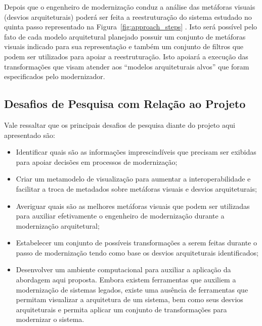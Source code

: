 \documentclass[12pt]{article}
\begin{document}
Depois que o engenheiro de modernização conduz a análise das metáforas visuais (desvios arquiteturais) poderá ser feita a reestruturação do sistema estudado no quinta passo representado na Figura~\ref{fig:approach_steps} . Isto será possível pelo fato de cada modelo arquitetural planejado possuir um conjunto de metáforas visuais indicado para sua representação e também um conjunto de filtros que podem ser utilizados para apoiar a reestruturação. Isto apoiará a execução das transformações que visam atender aos ``modelos arquiteturais alvos'' que foram especificados pelo modernizador. %


\subsection{Desafios de Pesquisa com Relação ao Projeto}

Vale ressaltar que os principais desafios de pesquisa diante do projeto aqui apresentado são:

\begin{itemize}
\item Identificar quais são as informações imprescindíveis que precisam ser exibidas para apoiar decisões em processos de modernização;
\item Criar um metamodelo de visualização para aumentar a interoperabilidade e facilitar a troca de metadados sobre  metáforas visuais e desvios arquiteturais;
\item Averiguar quais são as melhores metáforas visuais que podem ser utilizadas para auxiliar efetivamente o engenheiro de modernização durante a modernização arquitetural; 
\item Estabelecer um conjunto de possíveis transformações a serem feitas durante o passo de modernização tendo como base os desvios arquiteturais identificados;
\item Desenvolver um ambiente computacional para auxiliar a aplicação da abordagem aqui proposta. Embora existem ferramentas que auxiliem a modernização de sistemas legados, existe uma ausência de ferramentas que permitam visualizar a arquitetura de um sistema, bem como seus desvios arquiteturais e permita aplicar um conjunto de transformações para modernizar o sistema.

\end{itemize}
\end{document}
